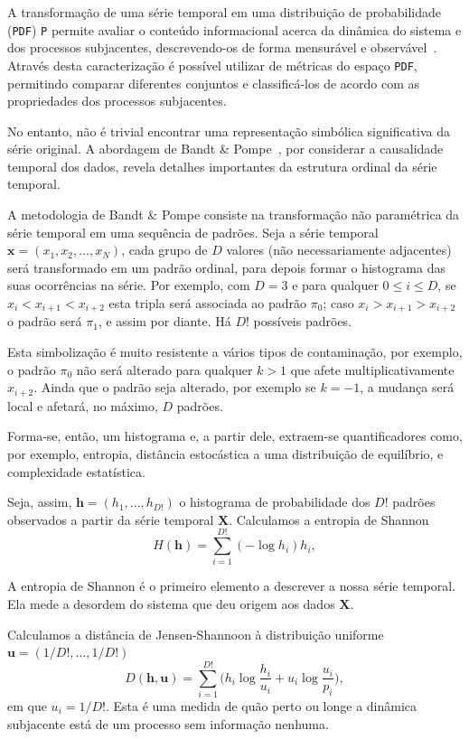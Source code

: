 \documentclass[remotesensing,article,submit,moreauthors,pdftex,10pt,a4paper]{Definitions/mdpi}
\begin{document}
	A transformação de uma série temporal em uma distribuição de probabilidade (\texttt{PDF}) \texttt{P} permite avaliar o conteúdo informacional acerca da dinâmica do sistema e dos processos subjacentes, descrevendo-os de forma mensurável e observável~\cite{Gray1990Entropy}.
	Através desta caracterização é possível utilizar de métricas do espaço \texttt{PDF}, permitindo comparar diferentes conjuntos e classificá-los de acordo com as propriedades dos processos subjacentes. 
	
	No entanto, não é trivial encontrar uma representação simbólica significativa da série original. 
	A abordagem de Bandt \& Pompe~\cite{Bandt2002Permutation}, por considerar a causalidade temporal dos dados, revela detalhes importantes da estrutura ordinal da série temporal.
	
	A metodologia de Bandt \& Pompe consiste na transformação não paramétrica da série temporal em uma sequência de padrões. 
	Seja a série temporal $\bm x = (x_1, x_2, \dots, x_N)$, cada grupo de $D$ valores (não necessariamente adjacentes) será transformado em um padrão ordinal, para depois formar o histograma das suas ocorrências na série.
	Por exemplo, com $D=3$ e para qualquer $0 \leq i \leq D$,
	se $x_i<x_{i+1}<x_{i+2}$ esta tripla será associada ao padrão $\pi_0$; 
	caso $x_i>x_{i+1}>x_{i+2}$ o padrão será $\pi_1$, e assim por diante.
	Há $D!$ possíveis padrões.
	
	Esta simbolização é muito resistente a vários tipos de contaminação, por exemplo, o padrão $\pi_0$ não será alterado para qualquer $k>1$ que afete multiplicativamente $x_{i+2}$.
	Ainda que o padrão seja alterado, por exemplo se $k=-1$, a mudança será local e afetará, no máximo, $D$ padrões.
	
	Forma-se, então, um histograma e, a partir dele, extraem-se quantificadores como, por exemplo, entropia, distância estocástica a uma distribuição de equilíbrio, e complexidade estatística.
	
	Seja, assim, $\bm h=(h_1,\dots,h_{D!})$ o histograma de probabilidade dos $D!$ padrões observados a partir da série temporal $\bm X$.
	Calculamos a entropia de Shannon
	\begin{equation}
	H(\bm h) = \sum_{i=1}^{D!} (-\log h_i) h_i,
	\label{eq:Entropia}
	\end{equation}
	
	A entropia de Shannon é o primeiro elemento a descrever a nossa série temporal.
	Ela mede a desordem do sistema que deu origem aos dados $\bm X$.
	
	Calculamos a distância de Jensen-Shannoon à distribuição uniforme $\bm u=(1/D!,\dots,1/D!)$
	\begin{equation}
	D(\bm h,\bm u) = \sum_{i=1}^{D!} \Big(h_i \log\frac{h_i}{u_i} +
	u_i \log\frac{u_i}{p_i}
	\Big),
	\end{equation}
	em que $u_i=1/D!$.
	Esta é uma medida de quão perto ou longe a dinâmica subjacente está de um processo sem informação nenhuma.
	
\end{document}
